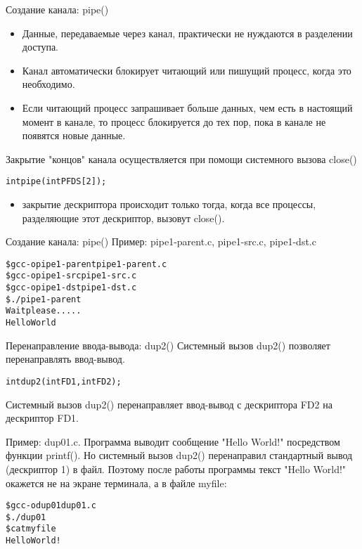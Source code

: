 \documentclass{beamer}
\begin{document}
\begin{frame}[fragile]{Создание канала: pipe()}
\begin{itemize}
\item Данные, передаваемые через канал, практически не нуждаются в разделении доступа. 
\item Канал автоматически блокирует читающий или пишущий процесс, когда это
необходимо. 
\item Если читающий процесс запрашивает больше данных, чем есть в настоящий момент в канале, то процесс блокируется до тех пор, пока в канале не появятся новые данные.
\end{itemize}
Закрытие "концов" канала осуществляется при помощи системного вызова close()
\begin{alltt}
int pipe (int PFDS[2]);
\end{alltt}
\begin{itemize}
\item закрытие дескриптора происходит только тогда, когда все процессы, разделяющие этот дескриптор, вызовут close().
\end{itemize}
\end{frame}

\begin{frame}[fragile]{Создание канала: pipe()}
Пример: pipe1-parent.c, pipe1-src.c, pipe1-dst.c
\begin{alltt}
\$ gcc -o pipe1-parent pipe1-parent.c
\$ gcc -o pipe1-src pipe1-src.c
\$ gcc -o pipe1-dst pipe1-dst.c
\$ ./pipe1-parent
Wait please.....
Hello World
\end{alltt}
\end{frame}

\begin{frame}[fragile]{Перенаправление ввода-вывода: dup2()}
Системный вызов dup2() позволяет перенаправлять ввод-вывод. 
\begin{alltt}
int dup2 (int FD1, int FD2);
\end{alltt}
Системный вызов dup2() перенаправляет ввод-вывод с дескриптора FD2 на дескриптор FD1. 

Пример: dup01.c. Программа выводит сообщение "Hello World!" посредством функции printf().
Но системный вызов dup2() перенаправил стандартный вывод (дескриптор 1) в файл. Поэтому после работы программы текст "Hello World!" окажется не на экране терминала, а в файле myfile:
\begin{alltt}
\$ gcc -o dup01 dup01.c
\$ ./dup01
\$ cat myfile
Hello World!
\end{alltt}
\end{frame}
\end{document}
